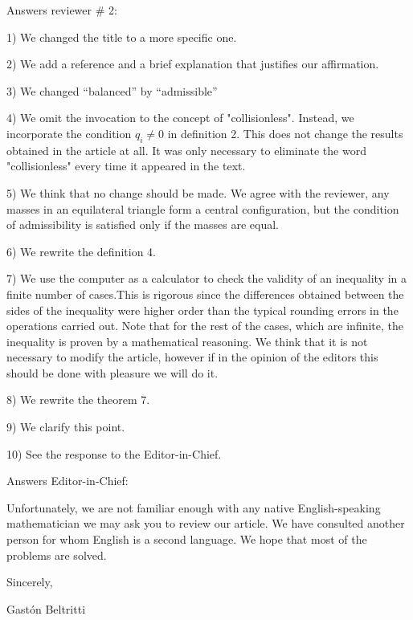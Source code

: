 \documentclass{article}
\begin{document}
Answers  reviewer # 2:

1) We changed the title to a more specific one.

2) We add a reference and a brief explanation that justifies our affirmation.

3) We changed ``balanced'' by ``admissible''

4) We omit the invocation to the concept of "collisionless". Instead, we incorporate the condition $q_i \neq 0$ in definition 2. This does not change the results obtained in the article at all. It was only necessary to eliminate the word "collisionless" every time it appeared in the text.

5) We think that no change should be made. We agree with the reviewer, any masses in an equilateral triangle form a central configuration, but the condition of admissibility is satisfied only if the masses are equal.

6) We rewrite the definition 4.

7) We use the computer as a calculator to check the validity of an inequality in a finite number of cases.This is rigorous since the differences obtained between the sides of the inequality were   higher order than the typical rounding errors in the operations carried out. Note that for the rest of the cases, which are infinite, the inequality is proven by a mathematical reasoning. We think that it is not necessary to modify the article, however if in the opinion of the editors this should be done with pleasure we will do it.

8) We rewrite the theorem 7.

9) We clarify this point.

10) See the response to the Editor-in-Chief.

Answers  Editor-in-Chief:

Unfortunately, we are not familiar enough with any native English-speaking mathematician we may ask you to review our article. We have consulted another person for whom English is a second language. We hope that most of the problems are solved.

Sincerely,
\vspace{.5cm}

Gastón Beltritti
\end{document}
